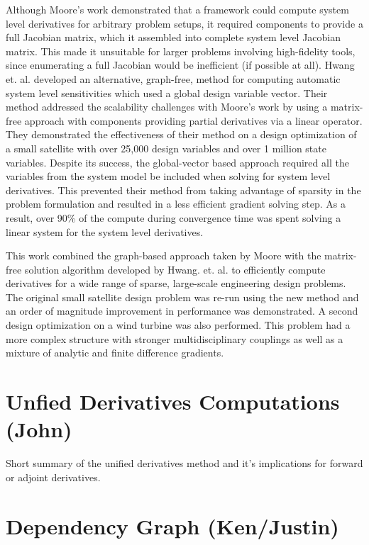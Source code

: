 \documentclass[]{aiaa-tc} %
\begin{document}
    Although Moore's work demonstrated that a framework could compute system level derivatives for arbitrary
    problem setups, it required components to provide a full Jacobian matrix, which it assembled into
    complete system level Jacobian matrix.  This made it unsuitable for larger problems involving 
    high-fidelity tools, since enumerating a full Jacobian would be inefficient (if possible at all).
    Hwang et. al. developed an alternative, graph-free, method for computing automatic system
    level sensitivities which used a global design variable vector\cite{CADRE2012}. Their method 
    addressed the scalability challenges with Moore's work by using a matrix-free approach with 
    components providing partial derivatives via a linear operator. They demonstrated the 
    effectiveness of their method on a design optimization of a small satellite
    with over 25,000 design variables and over 1 million state variables. Despite its success,
    the global-vector based approach required all the variables from the system model be
    included when solving for system level derivatives. This prevented their method
    from taking advantage of sparsity in the problem formulation and resulted in a less efficient gradient solving step.
    As a result, over 90\% of the compute during convergence time was spent solving a linear system for the system
    level derivatives.

    This work combined the graph-based approach taken by Moore with the matrix-free solution algorithm
    developed by Hwang. et. al. to efficiently compute derivatives for a wide range of sparse, large-scale engineering
    design problems. The original small satellite design problem was re-run using the new method and
    an order of magnitude improvement in performance was demonstrated. A second design optimization on a wind turbine was
    also performed. This problem had a more complex structure with stronger multidisciplinary couplings as well as a
    mixture of analytic and finite difference gradients.

  \section{Unfied Derivatives Computations (John)}
    Short summary of the unified derivatives method and it's implications for forward or adjoint derivatives.


  \section{Dependency Graph (Ken/Justin)}\label{section:depgraph}
\end{document}
